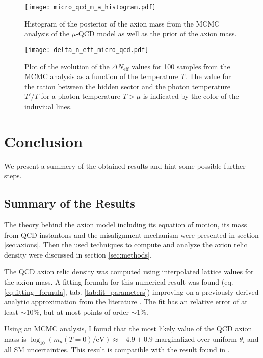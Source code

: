 \documentclass[twoside,a4paper, 12pt]{article}
\numberwithin{equation}{section}
\begin{document}
\begin{figure}[H]
    \centering
    \texttt{[image: micro\_qcd\_m\_a\_histogram.pdf]}
    \caption{Histogram of the posterior of the axion mass from the MCMC analysis of the $\mu$-QCD model
    as well as the prior of the axion mass.}
    \label{fig:micro_qcd_m_a_hist}
\end{figure}
\begin{figure}[H]
    \centering
    \texttt{[image: delta\_n\_eff\_micro\_qcd.pdf]}
    \caption{Plot of the evolution of the $\Delta N_\mathrm{eff}$ values for 100 samples from the MCMC analysis as a function of the temperature $T$.
    The value for the ration between the hidden sector and the photon temperature $T' / T$ 
    for a photon temperature $T > \mu$
    is indicated by the color of the induviual lines.}
    \label{fig:Delta_N_eff_plots}
\end{figure}

\newpage
\section{Conclusion}
We present a summery of the obtained results and hint some possible further steps.

\subsection{Summary of the Results}
The theory behind the axion model including its equation of motion, its mass from QCD instantons and the misalignment mechanism
were presented in section \ref{sec:axions}.
Then the used techniques to compute and analyze the axion relic density were discussed in section \ref{sec:methods}.

\noindent
The QCD axion relic density was computed using interpolated lattice values for the axion mass.
A fitting formula for this numerical result was found (eq. \eqref{eq:fitting_formula}, tab. \ref{tab:fit_parameters}) 
improving on a previously derived analytic approximation from the literature \cite{Fox:2004kb}.
The fit has an relative error of at least $\sim 10\%$, but at most points of order $\sim 1\%$.

\noindent
Using an MCMC analysis, I found that the most likely value of the QCD axion mass  
is $\log_{10} (m_a(T=0) / \mathrm{eV})  \approx -4.9 \pm 0.9$ marginalized over uniform $\theta_i$ and all SM uncertainties. This result is compatible with the result found in \cite{GambitAxionHoof}.
\end{document}
